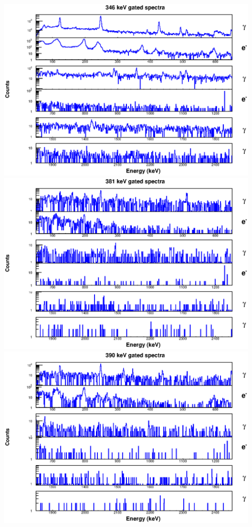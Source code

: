 \includegraphics[scale=0.8]{154Gd_Appendix/346_combined.eps}
\includegraphics[scale=0.8]{154Gd_Appendix/381_combined.eps}
\includegraphics[scale=0.8]{154Gd_Appendix/390_combined.eps}
